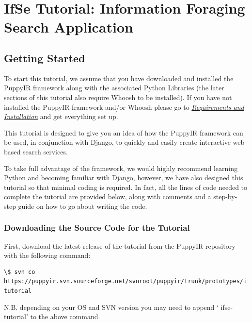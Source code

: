 \documentclass[letterpaper,10pt,english]{sphinxmanual}
\begin{document}
\section{IfSe Tutorial: Information Foraging Search Application}
\label{ifse-tutorial:information-foraging-puppyir-tutorial}\label{ifse-tutorial::doc}\label{ifse-tutorial:ifse-tutorial-information-foraging-search-application}

\subsection{Getting Started}
\label{ifse-tutorial:getting-started}
To start this tutorial, we assume that you have downloaded and installed the PuppyIR framework along with the associated Python Libraries (the later sections of this tutorial also require Whoosh to be installed). If you have not installed the PuppyIR framework and/or Whoosh please go to {\hyperref[installation:requirements-and-installation]{\emph{Requirements and Installation}}} and get everything set up.

This tutorial is designed to give you an idea of how the PuppyIR framework can be used, in conjunction with Django, to quickly and easily create interactive web based search services.

To take full advantage of the framework, we would highly recommend learning Python and becoming familiar with Django, however, we have also designed this tutorial so that minimal coding is required. In fact, all the lines of code needed to complete the tutorial are provided below, along with comments and a step-by-step guide on how to go about writing the code.


\subsubsection{Downloading the Source Code for the Tutorial}
\label{ifse-tutorial:downloading-the-source-code-for-the-tutorial}
First, download the latest release of the tutorial from the PuppyIR repository with the following command:

\begin{Verbatim}[commandchars=\\\{\}]
\$ svn co https://puppyir.svn.sourceforge.net/svnroot/puppyir/trunk/prototypes/ifse-tutorial
\end{Verbatim}

N.B. depending on your OS and SVN version you may need to append ` ifse-tutorial' to the above command.
\end{document}
